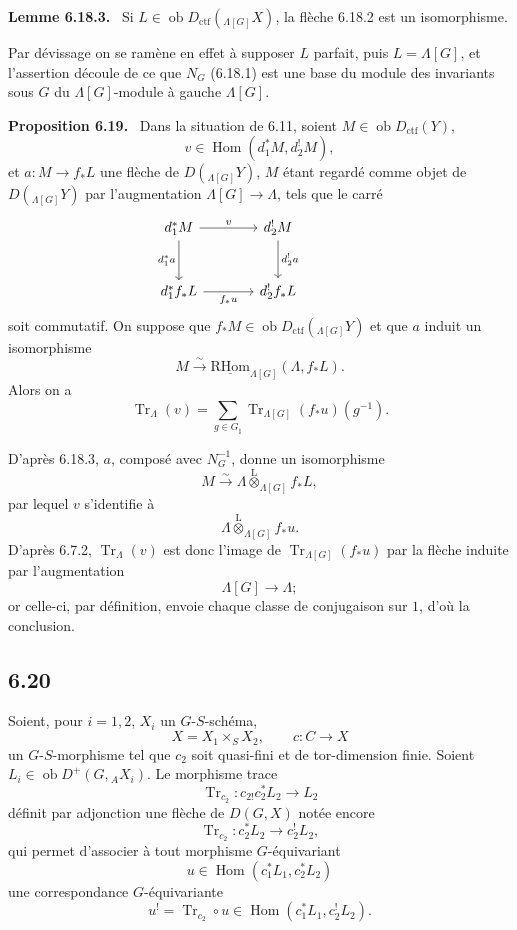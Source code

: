 \documentclass[11pt]{article}
\newenvironment{statement}[1]{\par\medskip\noindent\textbf{#1.}\ }{\par\medskip}
\DeclareMathOperator{\Hom}{Hom}
\providecommand{\RHom}{\mathrm{RHom}}
\providecommand{\uRHom}{\underline{\RHom}}
\providecommand{\Tr}{\operatorname{Tr}}
\providecommand{\Tr}{\operatorname{Tr}}
\providecommand{\lten}{\overset{\mathrm L}{\otimes}}
\providecommand{\Ob}{\operatorname{ob}}
\providecommand{\Tr}{\operatorname{Tr}}
\providecommand{\RHom}{\mathrm{RHom}}
\providecommand{\Hom}{\operatorname{Hom}}
\providecommand{\lten}{\overset{\mathrm L}{\otimes}}
\providecommand{\RHom}{\mathrm R\mathcal{H}om}
\providecommand{\lten}{\overset{\mathrm L}{\otimes}}
\providecommand{\Ob}{\operatorname{ob}}
\providecommand{\Tr}{\operatorname{Tr}}
\providecommand{\lten}{\overset{\mathrm L}{\otimes}}
\providecommand{\lten}{\overset{\mathrm L}{\otimes}}
\providecommand{\Ob}{\operatorname{Ob}}
\providecommand{\lten}{\overset{\mathrm L}{\otimes}}
\providecommand{\RHom}{\mathrm{RHom}}
\providecommand{\Hom}{\operatorname{Hom}}
\providecommand{\Tr}{\operatorname{Tr}}
\providecommand{\Ob}{\operatorname{ob}}
\providecommand{\Ob}{\operatorname{Ob}}
\providecommand{\lten}{\overset{\mathrm L}{\otimes}}
\begin{document}
\begin{statement}{Lemme 6.18.3}
Si $L\in\Ob D_{\mathrm{ctf}}({}_{\Lambda[G]}X)$, la flèche 6.18.2 est un isomorphisme.
\end{statement}

Par dévissage on se ramène en effet à supposer $L$ parfait, puis $L=\Lambda[G]$, et l'assertion découle de ce que $N_G$ (6.18.1) est une base du module des invariants sous $G$ du $\Lambda[G]$-module à gauche $\Lambda[G]$.

\begin{statement}{Proposition 6.19}
Dans la situation de 6.11, soient $M\in\Ob D_{\mathrm{ctf}}(Y)$,
\[
v\in\Hom(d_1^*M,d_2^!M),
\]
et $a:M\to f_*L$ une flèche de $D({}_{\Lambda[G]}Y)$, $M$ étant regardé comme objet de $D({}_{\Lambda[G]}Y)$ par l'augmentation $\Lambda[G]\to\Lambda$, tels que le carré
\[
\begin{tikzcd}[column sep=large,row sep=large]
d_1^*M \arrow[r,"v"] \arrow[d,"d_1^*a"'] & d_2^!M \arrow[d,"d_2^!a"] & {}\\
d_1^*f_*L \arrow[r,"f_*u"'] & d_2^!f_*L
\end{tikzcd}
\]
soit commutatif. On suppose que $f_*M\in\Ob D_{\mathrm{ctf}}({}_{\Lambda[G]}Y)$ et que $a$ induit un isomorphisme
\[
M\xrightarrow{\sim}\uRHom_{\Lambda[G]}(\Lambda,f_*L).
\]
Alors on a
\begin{equation}
\Tr_{\Lambda}(v)=
\sum_{g\in G_{\natural}}\Tr_{\Lambda[G]}(f_*u)(g^{-1}).
\tag{6.19.1}
\end{equation}
\end{statement}

D'après 6.18.3, $a$, composé avec $N_G^{-1}$, donne un isomorphisme
\[
M\xrightarrow{\sim}\Lambda\lten_{\Lambda[G]}f_*L,
\]
par lequel $v$ s'identifie à
\[
\Lambda\lten_{\Lambda[G]}f_*u.
\]
D'après 6.7.2, $\Tr_{\Lambda}(v)$ est donc l'image de $\Tr_{\Lambda[G]}(f_*u)$ par la flèche induite par l'augmentation
\[
\Lambda[G]\longrightarrow \Lambda;
\]
or celle-ci, par définition, envoie chaque classe de conjugaison sur $1$, d'où la conclusion.

\subsection*{6.20}
Soient, pour $i=1,2$, $X_i$ un $G$-$S$-schéma,
\[
X=X_1\times_SX_2,\qquad c:C\to X
\]
un $G$-$S$-morphisme tel que $c_2$ soit quasi-fini et de tor-dimension finie. Soient $L_i\in\Ob D^+(G,{}_AX_i)$. Le morphisme trace
\[
\Tr_{c_2}:c_{2!}c_2^*L_2\longrightarrow L_2
\]
définit par adjonction une flèche de $D(G,X)$ notée encore
\begin{equation}
\Tr_{c_2}:c_2^*L_2\longrightarrow c_2^!L_2,
\tag{6.20.1}
\end{equation}
qui permet d'associer à tout morphisme $G$-équivariant
\[
u\in\Hom(c_1^*L_1,c_2^*L_2)
\]
une correspondance $G$-équivariante
\begin{equation}
u^! = \Tr_{c_2}\circ u\in\Hom(c_1^*L_1,c_2^!L_2).
\tag{6.20.2}
\end{equation}
\end{document}
